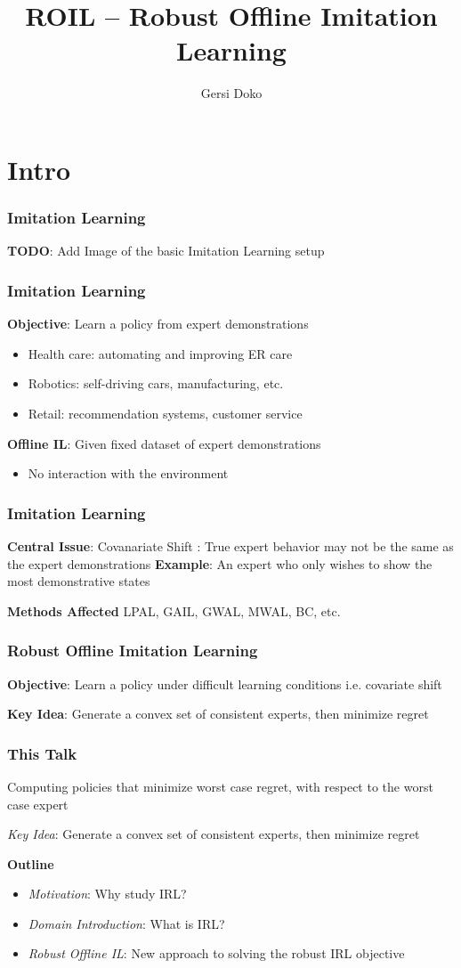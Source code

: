 \documentclass{beamer}
\title{ROIL -- Robust Offline Imitation Learning}
\author{Gersi Doko}
\institute{Department of Computer Science \\ University of New Hampshire}
\date{}
\begin{document}
\frame{\titlepage}

\section*{Intro}

\begin{frame}
	\frametitle{Imitation Learning}
	\textbf{TODO}: Add Image of the basic Imitation Learning setup
\end{frame}

\begin{frame}
	\frametitle{Imitation Learning}
	\textbf{Objective}: Learn a policy from expert demonstrations
	\begin{itemize}
	\item Health care: automating and improving ER care
	\item Robotics: self-driving cars, manufacturing, etc.
	\item Retail: recommendation systems, customer service
	
	\end{itemize}
	\vfill
	\textbf{Offline IL}: Given fixed dataset of expert demonstrations
	\begin{itemize}
		\item No interaction with the environment
	\end{itemize}

\end{frame}

\begin{frame}
	\frametitle{Imitation Learning}
	\textbf{Central Issue}: Covanariate Shift : True expert behavior may not be the same as the expert demonstrations
	\vfill
	\textbf{Example}: An expert who only wishes to show the most demonstrative states

	\vfill
	\textbf{Methods Affected} LPAL, GAIL, GWAL, MWAL, BC, etc.
\end{frame}

\begin{frame}
	\frametitle{Robust Offline Imitation Learning}
	\textbf{Objective}: Learn a policy under difficult learning conditions i.e. covariate shift

	\vfill

	\textbf{Key Idea}: Generate a convex set of consistent experts, then minimize regret
\end{frame}

\begin{frame}
	\frametitle{This Talk}
	Computing policies that minimize worst case regret, with respect to the worst case expert

	\vfill
	\emph{Key Idea}: Generate a convex set of consistent experts, then minimize regret

	\textbf{Outline}
	\begin{itemize}
	\item \emph{Motivation}: Why study IRL?
	\item \emph{Domain Introduction}: What is IRL?
	\item \emph{Robust Offline IL}: New approach to solving the robust IRL objective
	\end{itemize}
\end{frame}
\end{document}
